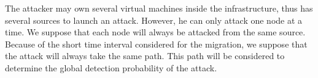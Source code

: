 The attacker may own several virtual machines inside the infrastructure, thus has several sources to launch an attack. However, he can only attack one node at a time. 
We suppose that each node will always be attacked from the same source. 
Because of the short time interval considered for the migration, we suppose that the attack will always take the same path. 
This path will be considered to determine the global detection probability of the attack.
